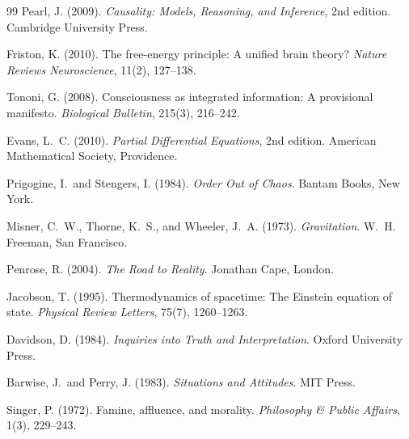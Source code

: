 \documentclass[11pt, oneside]{article}
\begin{document}
\begin{thebibliography}{99}
Pearl, J. (2009).
\newblock \emph{Causality: Models, Reasoning, and Inference}, 2nd edition.
\newblock Cambridge University Press.

Friston, K. (2010).
\newblock The free-energy principle: A unified brain theory?
\newblock \emph{Nature Reviews Neuroscience}, 11(2), 127--138.

Tononi, G. (2008).
\newblock Consciousness as integrated information: A provisional manifesto.
\newblock \emph{Biological Bulletin}, 215(3), 216--242.

Evans, L.~C. (2010).
\newblock \emph{Partial Differential Equations}, 2nd edition.
\newblock American Mathematical Society, Providence.

Prigogine, I.\ and Stengers, I. (1984).
\newblock \emph{Order Out of Chaos}.
\newblock Bantam Books, New York.

Misner, C.~W., Thorne, K.~S., and Wheeler, J.~A. (1973).
\newblock \emph{Gravitation}.
\newblock W.~H. Freeman, San Francisco.

Penrose, R. (2004).
\newblock \emph{The Road to Reality}.
\newblock Jonathan Cape, London.

Jacobson, T. (1995).
\newblock Thermodynamics of spacetime: The Einstein equation of state.
\newblock \emph{Physical Review Letters}, 75(7), 1260--1263.

Davidson, D. (1984).
\newblock \emph{Inquiries into Truth and Interpretation}.
\newblock Oxford University Press.

Barwise, J.\ and Perry, J. (1983).
\newblock \emph{Situations and Attitudes}.
\newblock MIT Press.

Singer, P. (1972).
\newblock Famine, affluence, and morality.
\newblock \emph{Philosophy \& Public Affairs}, 1(3), 229--243.

\end{thebibliography}
\end{document}
